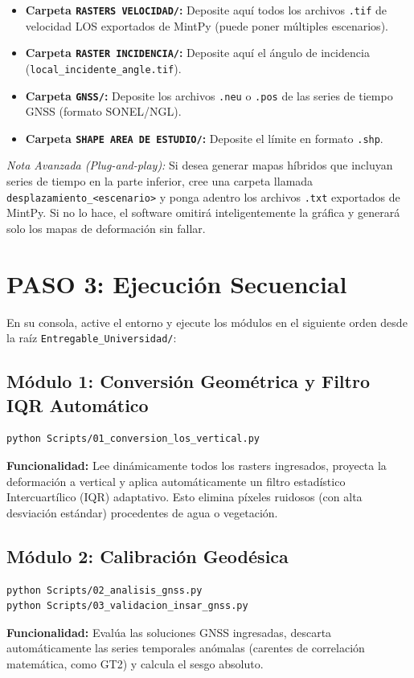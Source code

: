 ﻿\documentclass[11pt, a4paper]{article}
\begin{document}
\begin{itemize}
    \item \textbf{Carpeta \texttt{RASTERS VELOCIDAD/}:} Deposite aqu\'i todos los archivos \texttt{.tif} de velocidad LOS exportados de MintPy (puede poner m\'ultiples escenarios).
    \item \textbf{Carpeta \texttt{RASTER INCIDENCIA/}:} Deposite aqu\'i el \'angulo de incidencia (\texttt{local\_incidente\_angle.tif}).
    \item \textbf{Carpeta \texttt{GNSS/}:} Deposite los archivos \texttt{.neu} o \texttt{.pos} de las series de tiempo GNSS (formato SONEL/NGL).
    \item \textbf{Carpeta \texttt{SHAPE AREA DE ESTUDIO/}:} Deposite el l\'imite en formato \texttt{.shp}.
\end{itemize}

\textit{Nota Avanzada (Plug-and-play):} Si desea generar mapas h\'ibridos que incluyan series de tiempo en la parte inferior, cree una carpeta llamada \texttt{desplazamiento\_<escenario>} y ponga adentro los archivos \texttt{.txt} exportados de MintPy. Si no lo hace, el software omitir\'a inteligentemente la gr\'afica y generar\'a solo los mapas de deformaci\'on sin fallar.

\section{PASO 3: Ejecuci\'on Secuencial}
En su consola, active el entorno y ejecute los m\'odulos en el siguiente orden desde la ra\'iz \texttt{Entregable\_Universidad/}:

\subsection{M\'odulo 1: Conversi\'on Geom\'etrica y Filtro IQR Autom\'atico}
\begin{lstlisting}[language=bash]
python Scripts/01_conversion_los_vertical.py
\end{lstlisting}
\textbf{Funcionalidad:} Lee din\'amicamente todos los rasters ingresados, proyecta la deformaci\'on a vertical y aplica autom\'aticamente un filtro estad\'istico Intercuart\'ilico (IQR) adaptativo. Esto elimina píxeles ruidosos (con alta desviaci\'on est\'andar) procedentes de agua o vegetaci\'on.

\subsection{M\'odulo 2: Calibraci\'on Geod\'esica}
\begin{lstlisting}[language=bash]
python Scripts/02_analisis_gnss.py
python Scripts/03_validacion_insar_gnss.py
\end{lstlisting}
\textbf{Funcionalidad:} Eval\'ua las soluciones GNSS ingresadas, descarta autom\'aticamente las series temporales an\'omalas (carentes de correlaci\'on matem\'atica, como GT2) y calcula el sesgo absoluto.
\end{document}
